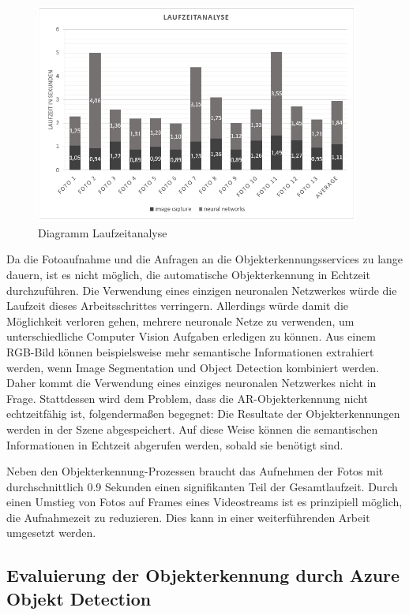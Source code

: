 \begin{figure}[H]
	\centering
	\includegraphics[width=0.95\textwidth]{images/table_Laufzeitanalyse2neu.PNG}
	\caption[Diagramm Laufzeitanalyse]{Diagramm Laufzeitanalyse}
	\label{table:laufzeitanalyse2}
\end{figure}

Da die Fotoaufnahme und die Anfragen an die Objekterkennungsservices zu lange dauern, ist es nicht möglich, die automatische Objekterkennung in Echtzeit durchzuführen. Die Verwendung eines einzigen neuronalen Netzwerkes würde die Laufzeit dieses Arbeitsschrittes verringern. Allerdings würde damit die Möglichkeit verloren gehen, mehrere neuronale Netze zu verwenden, um unterschiedliche Computer Vision Aufgaben erledigen zu können. Aus einem RGB-Bild können beispielsweise mehr semantische Informationen extrahiert werden, wenn Image Segmentation und Object Detection kombiniert werden. Daher kommt die Verwendung eines einziges neuronalen Netzwerkes nicht in Frage. Stattdessen wird dem Problem, dass die AR-Objekterkennung nicht echtzeitfähig ist, folgendermaßen begegnet: Die Resultate der Objekterkennungen werden in der Szene abgespeichert. Auf diese Weise können die semantischen Informationen in Echtzeit abgerufen werden, sobald sie benötigt sind.

Neben den Objekterkennung-Prozessen braucht das Aufnehmen der Fotos mit durchschnittlich 0.9 Sekunden einen signifikanten Teil der Gesamtlaufzeit. Durch einen Umstieg von Fotos auf Frames eines Videostreams ist es prinzipiell möglich, die Aufnahmezeit zu reduzieren. Dies kann in einer weiterführenden Arbeit umgesetzt werden. 
\subsection{Evaluierung der Objekterkennung durch Azure Objekt Detection}

